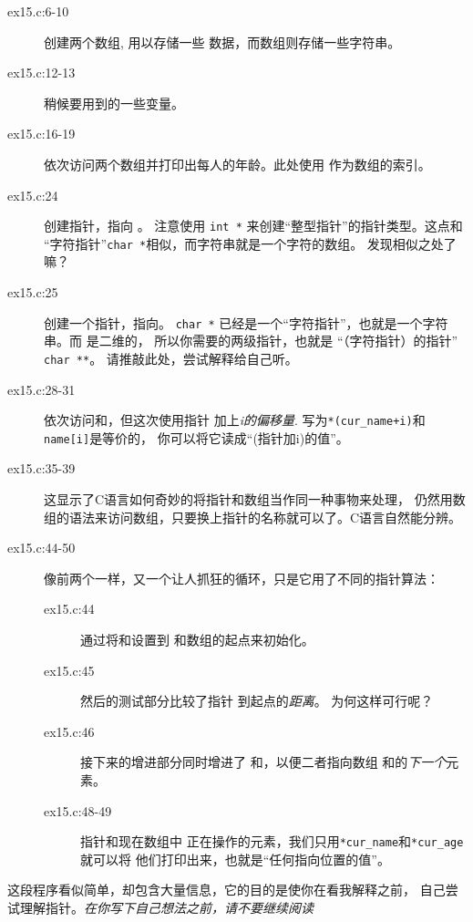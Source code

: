 \begin{description}
\item[ex15.c:6-10] 创建两个数组,  用以存储一些 
    数据，而数组则存储一些字符串。
\item[ex15.c:12-13] 稍候要用到的一些变量。
\item[ex15.c:16-19] 依次访问两个数组并打印出每人的年龄。此处使用
      作为数组的索引。
\item[ex15.c:24] 创建指针，指向 。
    注意使用 \verb|int *| 来创建“整型指针”的指针类型。这点和
    “字符指针”\verb|char *|相似，而字符串就是一个字符的数组。
    发现相似之处了嘛？
\item[ex15.c:25] 创建一个指针，指向。 \verb|char *| 
    已经是一个“字符指针”，也就是一个字符串。而 是二维的，
    所以你需要的两级指针，也就是 “（字符指针）的指针” \verb|char **|。
    请推敲此处，尝试解释给自己听。
\item[ex15.c:28-31] 依次访问和，但这次使用指针
    加上\emph{i的偏移量}.  写为\verb|*(cur_name+i)|和\verb|name[i]|是等价的，
    你可以将它读成“(指针加i)的值”。
\item[ex15.c:35-39] 这显示了C语言如何奇妙的将指针和数组当作同一种事物来处理，
    仍然用数组的语法来访问数组，只要换上指针的名称就可以了。C语言自然能分辨。
\item[ex15.c:44-50] 像前两个一样，又一个让人抓狂的循环，只是它用了不同的指针算法：
    \begin{description}
    \item[ex15.c:44] 通过将和设置到
        和数组的起点来初始化。
    \item[ex15.c:45] 然后的测试部分比较了指针
        到起点的\emph{距离}。 为何这样可行呢？
    \item[ex15.c:46] 接下来的增进部分同时增进了
        和，以便二者指向数组
        和的\emph{下一个}元素。
    \item[ex15.c:48-49] 指针和现在数组中
        正在操作的元素，我们只用\verb|*cur_name|和\verb|*cur_age|就可以将
        他们打印出来，也就是“任何指向位置的值”。
    \end{description}
\end{description}

这段程序看似简单，却包含大量信息，它的目的是使你在看我解释之前，
自己尝试理解指针。\emph{在你写下自己想法之前，请不要继续阅读}

